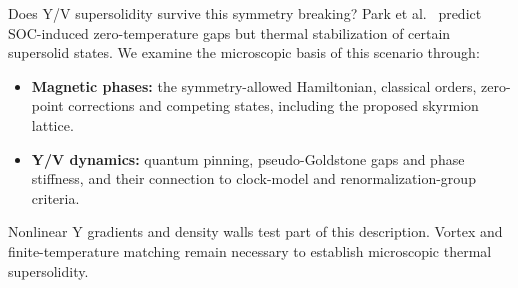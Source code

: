 Does Y/V supersolidity survive this symmetry breaking?
Park et al.~\cite{park2026} predict SOC-induced zero-temperature gaps
but thermal stabilization of certain supersolid states. We examine the
microscopic basis of this scenario through:
\begin{itemize}[itemsep=2pt,topsep=3pt]
\item \textbf{Magnetic phases:} the symmetry-allowed Hamiltonian,
classical orders, zero-point corrections and competing states,
including the proposed skyrmion lattice.
\item \textbf{Y/V dynamics:} quantum pinning, pseudo-Goldstone gaps
and phase stiffness, and their connection to clock-model and
renormalization-group criteria.
\end{itemize}
Nonlinear Y gradients and density walls test part of this description.
Vortex and finite-temperature matching remain necessary to establish
microscopic thermal supersolidity.

\endgroup
